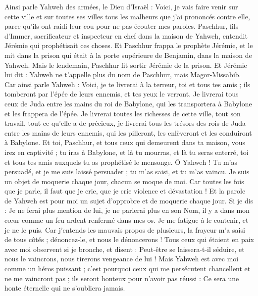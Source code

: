 \begin{multicols}{2}
Ainsi parle Yahweh des armées, le Dieu d'Israël : Voici, je vais faire venir sur cette ville et sur toutes ses villes tous les malheurs que j'ai prononcés contre elle, parce qu'ils ont raidi leur cou pour ne pas écouter mes paroles.
\VerseOne{}Paschhur, fils d'Immer, sacrificateur et inspecteur en chef dans la maison de Yahweh, entendit Jérémie qui prophétisait ces choses.
Et Paschhur frappa le prophète Jérémie, et le mit dans la prison qui était à la porte supérieure de Benjamin, dans la maison de Yahweh.
Mais le lendemain, Paschhur fit sortir Jérémie de la prison. Et Jérémie lui dit : Yahweh ne t'appelle plus du nom de Paschhur, mais Magor-Missabib.
Car ainsi parle Yahweh : Voici, je te livrerai à la terreur, toi et tous tes amis ; ils tomberont par l'épée de leurs ennemis, et tes yeux le verront. Je livrerai tous ceux de Juda entre les mains du roi de Babylone, qui les transportera à Babylone et les frappera de l'épée.
Je livrerai toutes les richesses de cette ville, tout son travail, tout ce qu'elle a de précieux, je livrerai tous les trésors des rois de Juda entre les mains de leurs ennemis, qui les pilleront, les enlèveront et les conduiront à Babylone.
Et toi, Paschhur, et tous ceux qui demeurent dans ta maison, vous irez en captivité ; tu iras à Babylone, et là tu mourras, et là tu seras enterré, toi et tous tes amis auxquels tu as prophétisé le mensonge.
Ô Yahweh ! Tu m'as persuadé, et je me suis laissé persuader ; tu m'as saisi, et tu m'as vaincu. Je suis un objet de moquerie chaque jour, chacun se moque de moi.
Car toutes les fois que je parle, il faut que je crie, que je crie violence et dévastation ! Et la parole de Yahweh est pour moi un sujet d'opprobre et de moquerie chaque jour.
Si je dis : Je ne ferai plus mention de lui, je ne parlerai plus en son Nom, il y a dans mon cœur comme un feu ardent renfermé dans mes os. Je me fatigue à le contenir, et je ne le puis.
Car j'entends les mauvais propos de plusieurs, la frayeur m'a saisi de tous côtés ; dénoncez-le, et nous le dénoncerons ! Tous ceux qui étaient en paix avec moi observent si je bronche, et disent : Peut-être se laissera-t-il séduire, et nous le vaincrons, nous tirerons vengeance de lui !
Mais Yahweh est avec moi comme un héros puissant ; c'est pourquoi ceux qui me persécutent chancellent et ne me vaincront pas ; ils seront honteux pour n'avoir pas réussi : Ce sera une honte éternelle qui ne s'oubliera jamais.

\end{multicols}
